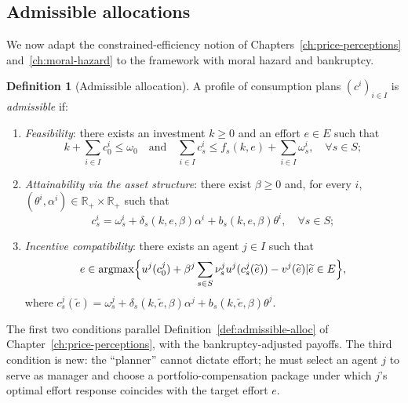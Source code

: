 \documentclass[11pt,a4paper,oneside]{book}
\def\R{\mathbb{R}}
\def\leq{\leqslant}
\def\geq{\geqslant}
\def\et{\quad \text{and} \quad}
\DeclareMathOperator*{\argmax}{argmax}
\theoremstyle{plain}
\theoremstyle{definition}
\newtheorem{definition}[theorem]{Definition}
\theoremstyle{remark}
\numberwithin{equation}{chapter}
\begin{document}
\subsection{Admissible allocations}

We now adapt the constrained-efficiency notion of Chapters~\ref{ch:price-perceptions} and~\ref{ch:moral-hazard} to the framework with moral hazard and bankruptcy.

\begin{definition}[Admissible allocation]\label{def:admissible-MH-CPP}
A profile of consumption plans $(c^i)_{i \in I}$ is \emph{admissible} if:
\begin{enumerate}
  \item[(i)] \emph{Feasibility}: there exists an investment $k \geq 0$ and an effort $e \in E$ such that
  \begin{equation*}
    k + \sum_{i \in I} c^i_0 \leq \omega_0
    \et
    \sum_{i \in I} c^i_s \leq f_s(k, e) + \sum_{i \in I} \omega^i_s, \quad \forall s \in S;
  \end{equation*}
  \item[(ii)] \emph{Attainability via the asset structure}: there exist $\beta \geq 0$ and, for every $i$, $(\theta^i, \alpha^i) \in \R_+ \times \R_+$ such that
  \begin{equation*}
    c^i_s = \omega^i_s + \delta_s(k, e, \beta) \alpha^i + b_s(k, e, \beta) \theta^i, \quad \forall s \in S;
  \end{equation*}
  \item[(iii)] \emph{Incentive compatibility}: there exists an agent $j \in I$ such that
  \begin{equation*}
    e \in \argmax \Bigl\{ u^j(c^j_0) + \beta^j \sum_{s \in S} \nu^j_s u^j(c^j_s(\widetilde{e})) - v^j(\widetilde{e}) \vert \widetilde{e} \in E \Bigr\},
  \end{equation*}
  where $c^j_s(\widetilde{e}) = \omega^j_s + \delta_s(k, \widetilde{e}, \beta) \alpha^j + b_s(k, \widetilde{e}, \beta) \theta^j$.
\end{enumerate}
\end{definition}

The first two conditions parallel Definition~\ref{def:admissible-alloc} of Chapter~\ref{ch:price-perceptions}, with the bankruptcy-adjusted payoffs.
The third condition is new: the ``planner'' cannot dictate effort; he must select an agent $j$ to serve as manager and choose a portfolio-compensation package under which $j$'s optimal effort response coincides with the target effort $e$.
\end{document}
